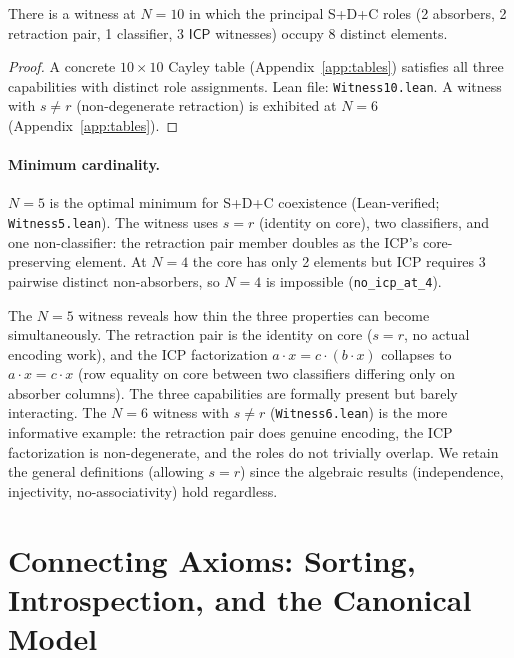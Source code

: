 \documentclass[sigconf,screen]{acmart}
\newcommand{\dotop}{\cdot}
\newcommand{\ICP}{\textsf{ICP}}
\theoremstyle{remark}
\begin{document}
\begin{proposition}
\label{thm:separated}
There is a witness at $N\!=\!10$ in which the principal S+D+C roles (2 absorbers, 2 retraction pair, 1 classifier, 3 $\ICP$ witnesses) occupy 8 distinct elements.
\end{proposition}

\begin{proof}
A concrete $10 \times 10$ Cayley table (Appendix~\ref{app:tables}) satisfies all three capabilities with distinct role assignments. Lean file: \texttt{Witness10.lean}. A witness with $s \neq r$ (non-degenerate retraction) is exhibited at $N\!=\!6$ (Appendix~\ref{app:tables}).
\end{proof}

\paragraph{Minimum cardinality.}
$N\!=\!5$ is the optimal minimum for S+D+C coexistence (Lean-verified; \texttt{Witness5.lean}). The witness uses $s = r$ (identity on core), two classifiers, and one non-classifier: the retraction pair member doubles as the ICP's core-preserving element. At $N\!=\!4$ the core has only 2 elements but ICP requires 3 pairwise distinct non-absorbers, so $N\!=\!4$ is impossible (\texttt{no\_icp\_at\_4}).

The $N\!=\!5$ witness reveals how thin the three properties can become simultaneously. The retraction pair is the identity on core ($s = r$, no actual encoding work), and the ICP factorization $a \dotop x = c \dotop (b \dotop x)$ collapses to $a \dotop x = c \dotop x$ (row equality on core between two classifiers differing only on absorber columns). The three capabilities are formally present but barely interacting. The $N\!=\!6$ witness with $s \neq r$ (\texttt{Witness6.lean}) is the more informative example: the retraction pair does genuine encoding, the ICP factorization is non-degenerate, and the roles do not trivially overlap. We retain the general definitions (allowing $s = r$) since the algebraic results (independence, injectivity, no-associativity) hold regardless.

\section{Connecting Axioms: Sorting, Introspection, and the Canonical Model}
\label{sec:sorting}
\end{document}
